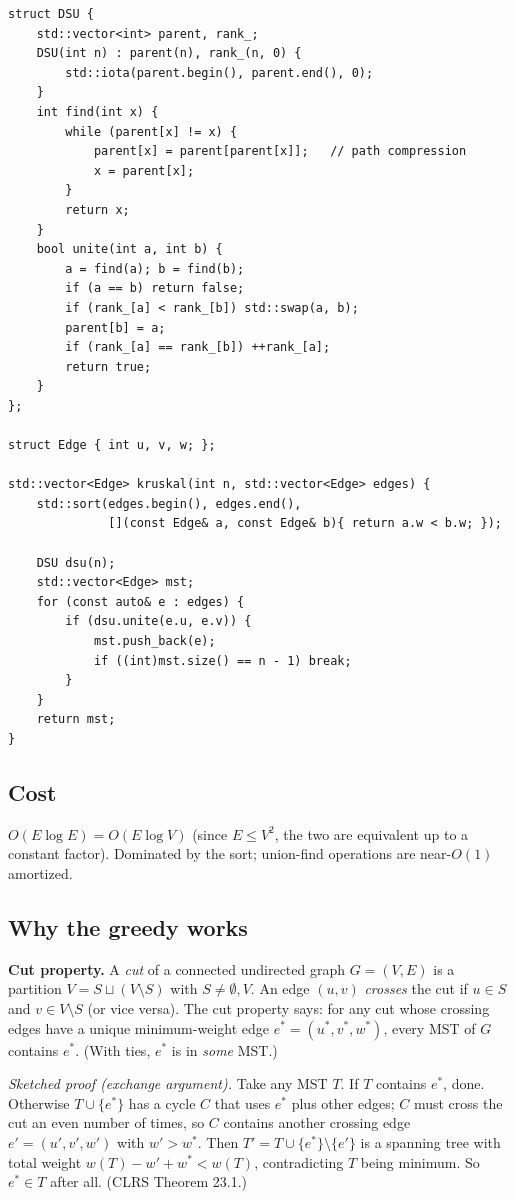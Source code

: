 \documentclass[11pt]{article}
\begin{document}
\begin{lstlisting}[basicstyle=\ttfamily\small,frame=single]
struct DSU {
    std::vector<int> parent, rank_;
    DSU(int n) : parent(n), rank_(n, 0) {
        std::iota(parent.begin(), parent.end(), 0);
    }
    int find(int x) {
        while (parent[x] != x) {
            parent[x] = parent[parent[x]];   // path compression
            x = parent[x];
        }
        return x;
    }
    bool unite(int a, int b) {
        a = find(a); b = find(b);
        if (a == b) return false;
        if (rank_[a] < rank_[b]) std::swap(a, b);
        parent[b] = a;
        if (rank_[a] == rank_[b]) ++rank_[a];
        return true;
    }
};

struct Edge { int u, v, w; };

std::vector<Edge> kruskal(int n, std::vector<Edge> edges) {
    std::sort(edges.begin(), edges.end(),
              [](const Edge& a, const Edge& b){ return a.w < b.w; });

    DSU dsu(n);
    std::vector<Edge> mst;
    for (const auto& e : edges) {
        if (dsu.unite(e.u, e.v)) {
            mst.push_back(e);
            if ((int)mst.size() == n - 1) break;
        }
    }
    return mst;
}
\end{lstlisting}

\subsection*{Cost}

$O(E \log E) = O(E \log V)$ (since $E \leq V^2$, the two are equivalent up to a constant factor). Dominated by the sort; union-find operations are near-$O(1)$ amortized.

\subsection*{Why the greedy works}

\begin{defnbox}
\textbf{Cut property.} A \emph{cut} of a connected undirected graph
$G = (V, E)$ is a partition $V = S \sqcup (V \setminus S)$ with
$S \neq \emptyset, V$. An edge $(u, v)$ \emph{crosses} the cut if
$u \in S$ and $v \in V \setminus S$ (or vice versa). The cut
property says: for any cut whose crossing edges have a unique
minimum-weight edge $e^* = (u^*, v^*, w^*)$, every MST of $G$
contains $e^*$. (With ties, $e^*$ is in \emph{some} MST.)

\emph{Sketched proof (exchange argument).} Take any MST $T$. If
$T$ contains $e^*$, done. Otherwise $T \cup \{e^*\}$ has a cycle
$C$ that uses $e^*$ plus other edges; $C$ must cross the cut an
even number of times, so $C$ contains another crossing edge
$e' = (u', v', w')$ with $w' > w^*$. Then
$T' = T \cup \{e^*\} \setminus \{e'\}$ is a spanning tree with
total weight $w(T) - w' + w^* < w(T)$, contradicting $T$ being
minimum. So $e^* \in T$ after all. (CLRS Theorem 23.1.)
\end{defnbox}
\end{document}
